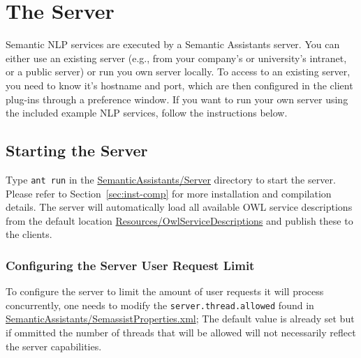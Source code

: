 
\chapter{The \sa Server}
\label{chap:serv}
Semantic NLP services are executed by a Semantic Assistants
server. You can either use an existing server (e.g., from your
company's or university's intranet, or a public server) or run you own
server locally. To access to an existing server, you need to know it's
hostname and port, which are then configured in the client plug-ins
through a preference window.  If you want to run your own server using
the included example NLP services, follow the instructions below.

\section{Starting the Server}
Type \texttt{ant run} in the \url{SemanticAssistants/Server} directory
to start the server. Please refer to Section~\ref{sec:inst-comp} for
more installation and compilation details. The server will
automatically load all available OWL service descriptions from the
default location \url{Resources/OwlServiceDescriptions} and publish
these to the clients.

\subsection{Configuring the Server User Request Limit}
To configure the server to limit the amount of user requests it will
process concurrently, one needs to modify the \texttt{server.thread.allowed}
found in \url{SemanticAssistants/SemassistProperties.xml};  The default
value is already set but if ommitted the number of threads that will
be allowed will not necessarily reflect the server capabilities.

